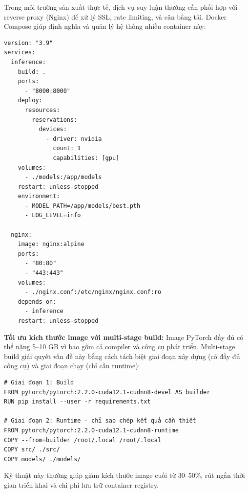 Trong môi trường sản xuất thực tế, dịch vụ suy luận thường cần phối hợp với reverse proxy (Nginx) để xử lý SSL, rate limiting, và cân bằng tải. Docker Compose giúp định nghĩa và quản lý hệ thống nhiều container này:

\begin{verbatim}
version: "3.9"
services:
  inference:
    build: .
    ports:
      - "8000:8000"
    deploy:
      resources:
        reservations:
          devices:
            - driver: nvidia
              count: 1
              capabilities: [gpu]
    volumes:
      - ./models:/app/models
    restart: unless-stopped
    environment:
      - MODEL_PATH=/app/models/best.pth
      - LOG_LEVEL=info

  nginx:
    image: nginx:alpine
    ports:
      - "80:80"
      - "443:443"
    volumes:
      - ./nginx.conf:/etc/nginx/nginx.conf:ro
    depends_on:
      - inference
    restart: unless-stopped
\end{verbatim}

\begin{mdframed}[style=infobox]
\textbf{Tối ưu kích thước image với multi-stage build:} Image PyTorch đầy đủ có thể nặng 5--10 GB vì bao gồm cả compiler và công cụ phát triển. Multi-stage build giải quyết vấn đề này bằng cách tách biệt giai đoạn xây dựng (có đầy đủ công cụ) và giai đoạn chạy (chỉ cần runtime):

\begin{verbatim}
# Giai đoạn 1: Build
FROM pytorch/pytorch:2.2.0-cuda12.1-cudnn8-devel AS builder
RUN pip install --user -r requirements.txt

# Giai đoạn 2: Runtime - chỉ sao chép kết quả cần thiết
FROM pytorch/pytorch:2.2.0-cuda12.1-cudnn8-runtime
COPY --from=builder /root/.local /root/.local
COPY src/ ./src/
COPY models/ ./models/
\end{verbatim}

Kỹ thuật này thường giúp giảm kích thước image cuối từ 30--50\%, rút ngắn thời gian triển khai và chi phí lưu trữ container registry.
\end{mdframed}

